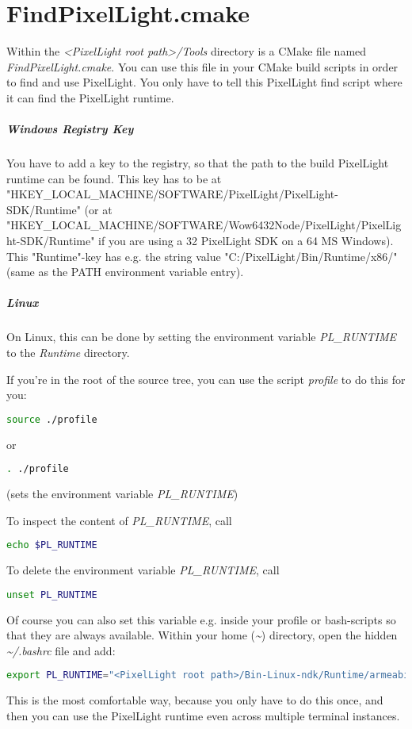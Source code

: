 \chapter{FindPixelLight.cmake}
\label{Appendix:FindPixelLight}
Within the \emph{<PixelLight root path>/Tools} directory is a CMake file named \emph{FindPixelLight.cmake}. You can use this file in your CMake build scripts in order to find and use PixelLight. You only have to tell this PixelLight find script where it can find the PixelLight runtime.


\paragraph{Windows Registry Key}
You have to add a key to the registry, so that the path to the build PixelLight runtime can be found. This key has to be at "HKEY\_LOCAL\_MACHINE/SOFTWARE/PixelLight/PixelLight-SDK/Runtime" (or at "HKEY\_LOCAL\_MACHINE/SOFTWARE/Wow6432Node/PixelLight/PixelLight-SDK/Runtime" if you are using a \SI{32}{\bit} PixelLight \ac{SDK} on a \SI{64}{\bit} \ac{MS} Windows). This "Runtime"-key has e.g. the string value "C:/PixelLight/Bin/Runtime/x86/" (same as the PATH environment variable entry).


\paragraph{Linux}
On Linux, this can be done by setting the environment variable \emph{PL\_RUNTIME} to the \emph{Runtime} directory.

If you're in the root of the source tree, you can use the script \emph{profile} to do this for you:
\begin{lstlisting}[language=sh]
source ./profile
\end{lstlisting}
or
\begin{lstlisting}[language=sh]
. ./profile
\end{lstlisting}
(sets the environment variable \emph{PL\_RUNTIME})

To inspect the content of \emph{PL\_RUNTIME}, call
\begin{lstlisting}[language=sh]
echo $PL_RUNTIME
\end{lstlisting}

To delete the environment variable \emph{PL\_RUNTIME}, call
\begin{lstlisting}[language=sh]
unset PL_RUNTIME
\end{lstlisting}

Of course you can also set this variable e.g. inside your profile or bash-scripts so that they are always available. Within your home (\emph{\textasciitilde}) directory, open the hidden \emph{\textasciitilde /.bashrc} file and add:
\begin{lstlisting}[language=sh]
export PL_RUNTIME="<PixelLight root path>/Bin-Linux-ndk/Runtime/armeabi-v7a"
\end{lstlisting}
This is the most comfortable way, because you only have to do this once, and then you can use the PixelLight runtime even across multiple terminal instances.

